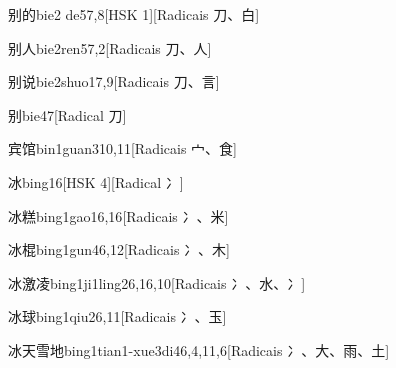\begin{entry}{别的}{bie2 de5}{7,8}[HSK 1][Radicais ⼑、⽩]
\end{entry}

\begin{entry}{别人}{bie2ren5}{7,2}[Radicais ⼑、⼈]
\end{entry}

\begin{entry}{别说}{bie2shuo1}{7,9}[Radicais ⼑、⾔]
\end{entry}

\begin{entry}{别}{bie4}{7}[Radical ⼑]
\end{entry}

\begin{entry}{宾馆}{bin1guan3}{10,11}[Radicais ⼧、⾷]
\end{entry}

\begin{entry}{冰}{bing1}{6}[HSK 4][Radical ⼎]
\end{entry}

\begin{entry}{冰糕}{bing1gao1}{6,16}[Radicais ⼎、⽶]
\end{entry}

\begin{entry}{冰棍}{bing1gun4}{6,12}[Radicais ⼎、⽊]
\end{entry}

\begin{entry}{冰激凌}{bing1ji1ling2}{6,16,10}[Radicais ⼎、⽔、⼎]
\end{entry}

\begin{entry}{冰球}{bing1qiu2}{6,11}[Radicais ⼎、⽟]
\end{entry}

\begin{entry}{冰天雪地}{bing1tian1-xue3di4}{6,4,11,6}[Radicais ⼎、⼤、⾬、⼟]
\end{entry}

